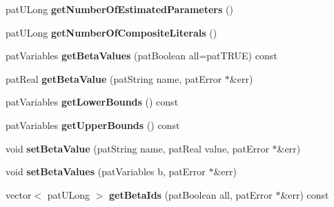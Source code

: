 \begin{DoxyCompactItemize}
\item 
\mbox{\label{classbio_literal_repository_a77ca3d58dde911d7d9f96bbd6b1a1013}} 
pat\+U\+Long {\bfseries get\+Number\+Of\+Estimated\+Parameters} ()
\item 
\mbox{\label{classbio_literal_repository_ad9be1455bf01911efc710496ab4e6168}} 
pat\+U\+Long {\bfseries get\+Number\+Of\+Composite\+Literals} ()
\item 
\mbox{\label{classbio_literal_repository_af49dabcb6db2feb5ae88261601f38a48}} 
pat\+Variables {\bfseries get\+Beta\+Values} (pat\+Boolean all=pat\+T\+R\+UE) const
\item 
\mbox{\label{classbio_literal_repository_af955c2b7a30b86b4104c1d43ff2a7cf9}} 
pat\+Real {\bfseries get\+Beta\+Value} (pat\+String name, pat\+Error $\ast$\&err)
\item 
\mbox{\label{classbio_literal_repository_aa5c54dc6f252589cad394c8edc386c3b}} 
pat\+Variables {\bfseries get\+Lower\+Bounds} () const
\item 
\mbox{\label{classbio_literal_repository_a60909e87b23fdf9c5136e3690abae66e}} 
pat\+Variables {\bfseries get\+Upper\+Bounds} () const
\item 
\mbox{\label{classbio_literal_repository_a93b6323d1e07283fa100d7a7a7c12321}} 
void {\bfseries set\+Beta\+Value} (pat\+String name, pat\+Real value, pat\+Error $\ast$\&err)
\item 
\mbox{\label{classbio_literal_repository_aacf5b12f477262b29eafd07d9210235e}} 
void {\bfseries set\+Beta\+Values} (pat\+Variables b, pat\+Error $\ast$\&err)
\item 
\mbox{\label{classbio_literal_repository_ad87247c8147523ad04289c18add9d048}} 
vector$<$ pat\+U\+Long $>$ {\bfseries get\+Beta\+Ids} (pat\+Boolean all, pat\+Error $\ast$\&err) const
\item 
\mbox{\label{classbio_literal_repository_a5b847d018eee663185f5f1afe6936f09}} 

\end{DoxyCompactItemize}
